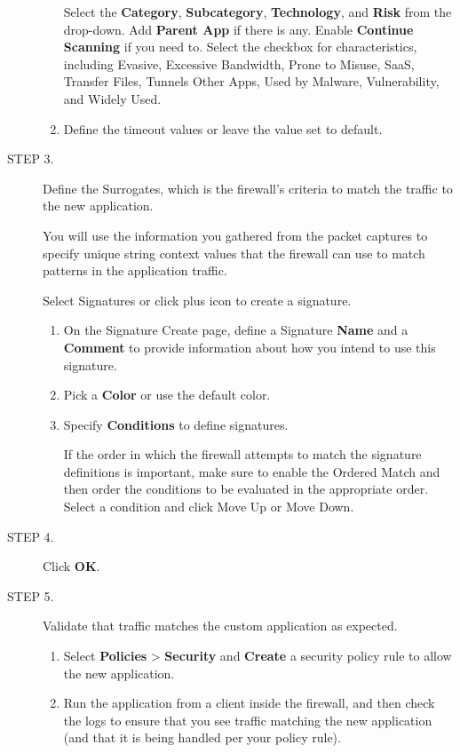 \begin{description}
\begin{enumerate}
            Select the \textbf{Category}, \textbf{Subcategory}, \textbf{Technology}, and \textbf{Risk} from the drop-down. Add \textbf{Parent App} if there is any. 
            Enable \textbf{Continue Scanning} if you need to. Select the checkbox for characteristics, including Evasive, Excessive Bandwidth, 
            Prone to Misuse, SaaS, Transfer Files, Tunnels Other Apps, Used by Malware, Vulnerability, and Widely Used.
        \item Define the timeout values or leave the value set to default.
    \end{enumerate}
    \item[STEP 3.]	Define the Surrogates, which is the firewall's criteria to match the traffic to the new application.


        You will use the information you gathered from the packet captures to specify unique string context values that the firewall can use to match patterns in the application traffic.
             
        
        Select Signatures or click plus icon to create a signature.
    \begin{enumerate}
        \item On the Signature Create page, define a Signature \textbf{Name} and a \textbf{Comment} to provide information about how you intend to use this signature.
        \item Pick a \textbf{Color} or use the default color.
        \item Specify \textbf{Conditions} to define signatures.
        

            If the order in which the firewall attempts to match the signature definitions is important, make sure to enable the Ordered Match and then 
            order the conditions to be evaluated in the appropriate order. Select a condition and click Move Up or Move Down.
    \end{enumerate}
    \item[STEP 4.]	Click \textbf{OK}.
    \item[STEP 5.]	Validate that traffic matches the custom application as expected.
    \begin{enumerate}
        \item Select \textbf{Policies} > \textbf{Security} and \textbf{Create} a security policy rule to allow the new application.
        \item Run the application from a client inside the firewall, and then check the logs to ensure that 
        you see traffic matching the new application (and that it is being handled per your policy rule).
    \end{enumerate}
\end{description}


